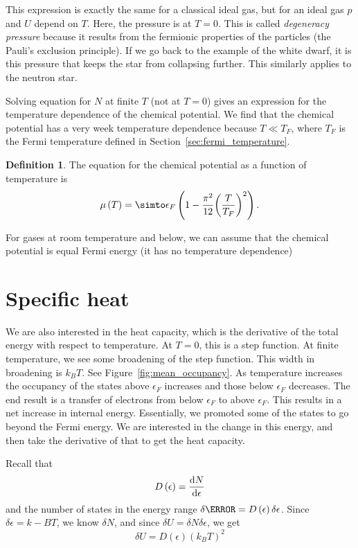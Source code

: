 \documentclass[12pt,chapterprefix=false,dvipsnames]{scrbook}
\theoremstyle{dotless}
\theoremstyle{definition}
\newtheorem{protodefinition}{Definition}[section]
\newenvironment{definition}
{\colorlet{shadecolor}{black!15}\begin{shaded}\begin{protodefinition}}
			{\end{protodefinition}\end{shaded}}
\begin{document}
This expression is exactly the same for a classical ideal gas,
but for an ideal gas $p$ and
$U$ depend on $T$. Here,
the pressure is at $T = 0$. This is called
\textit{degeneracy pressure} because it results from the fermionic
properties of the particles (the Pauli's exclusion principle).
If we go back to the example of the white dwarf, it is this
pressure that keeps the star from collapsing further. This
similarly applies to the neutron star.

Solving equation for $N$ at finite
$T$ (not at $T = 0$) gives
an expression for the temperature dependence of the chemical
potential. We find that the chemical potential has a very week
temperature dependence because $T \ll T_F$, where
$T_F$ is the Fermi temperature defined in
Section~\ref{sec:fermi_temperature}.
\begin{definition}
	The equation for the chemical potential as a function of
	temperature is
	\begin{equation}
		\mu\left(T\right)
        =
		\simto
		\epsilon_F\left(1 - \frac{\pi^2}{12}{\left(\frac{T}{T_F}\right)}^2\right).
	\end{equation}

	For gases at room temperature and below, we can assume that the
	chemical potential is equal Fermi energy (it has no temperature
	dependence)
\end{definition}

\section{Specific heat}%
\label{sec:specific_heat}

We are also interested in the heat capacity, which is the
derivative of the total energy with respect to temperature. At
$T = 0$, this is a step function. At finite
temperature, we see some broadening of the step function. This
width in broadening is $k_B T$. See
Figure~\ref{fig:mean_occupancy}. As temperature increases the
occupancy of the states above $\epsilon_F$ increases
and those below $\epsilon_F$ decreases. The end
result is a transfer of electrons from below
$\epsilon_F$ to above $\epsilon_F$. This
results in a net increase in internal energy. Essentially, we
promoted some of the states to go beyond the Fermi energy. We
are interested in the change in this energy, and then take the
derivative of that to get the heat capacity.

Recall that
\begin{equation}
	\label{eq:density_of_states_wrt_number_of_states}
	D\left(\epsilon\right) = \dv{N}{\epsilon}
\end{equation}
and the number of states in the energy range
$\delta\N = D\left(\epsilon\right)\delta\epsilon$. Since $\delta\epsilon = k-B T$, we know
$\delta N$, and since $\delta U = \delta N\delta\epsilon$, we
get
\begin{equation}
	\delta U
	=
	D\left(\epsilon\right){\left(k_B T\right)}^2
\end{equation}
\end{document}
